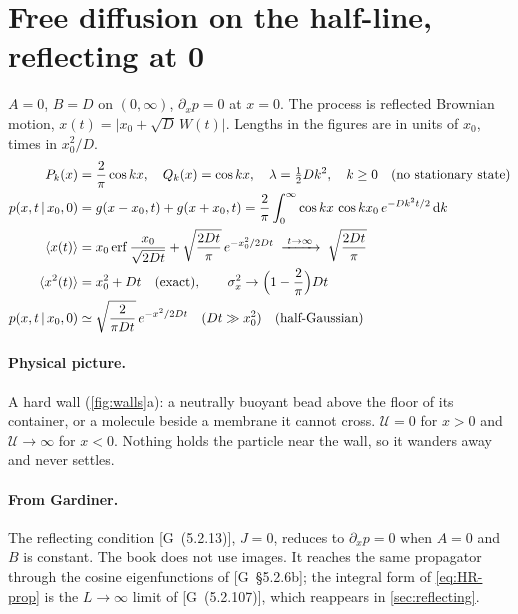 \documentclass[11pt]{article}
\numberwithin{equation}{section}
\newcommand{\dd}{\mathrm{d}}
\newcommand{\avg}[1]{\langle #1\rangle}
\newcommand{\given}{\,|\,}
\newcommand{\G}[1]{[G~(#1)]}
\newcommand{\Gs}[1]{[G~\S#1]}
\begin{document}
\section{Free diffusion on the half-line, reflecting at 0}
\label{sec:hl-reflecting}

\begin{keyresults}
$A=0$, $B=D$ on $(0,\infty)$, $\partial_xp=0$ at $x=0$. The process is reflected Brownian motion,
$x(t)=\lvert x_0+\sqrt D\,W(t)\rvert$. Lengths in the figures are in units of $x_0$, times in $x_0^2/D$.
\begin{align}
  P_k(x) &= \frac2\pi\cos kx,\quad Q_k(x)=\cos kx,\quad \lambda=\tfrac12Dk^2,\quad k\ge0
  \quad\text{(no stationary state)} \\
  p(x,t\given x_0,0) &= g(x-x_0,t)+g(x+x_0,t)
  = \frac2\pi\int_0^\infty\cos kx\,\cos kx_0\,e^{-Dk^2t/2}\,\dd k \label{eq:HR-prop}\\
  \avg{x(t)} &= x_0\operatorname{erf}\frac{x_0}{\sqrt{2Dt}}+\sqrt{\frac{2Dt}{\pi}}\,e^{-x_0^2/2Dt}
  \;\xrightarrow{\;t\to\infty\;}\;\sqrt{\frac{2Dt}{\pi}} \\
  \avg{x^2(t)} &= x_0^2+Dt \quad\text{(exact)},\qquad
  \sigma_x^2\to\Bigl(1-\frac2\pi\Bigr)Dt \\
  p(x,t\given x_0,0) &\simeq \sqrt{\frac{2}{\pi Dt}}\,e^{-x^2/2Dt}\quad (Dt\gg x_0^2)\quad\text{(half-Gaussian)}
\end{align}
\end{keyresults}

\paragraph{Physical picture.} A hard wall (\cref{fig:walls}a): a neutrally buoyant bead above the floor of its
container, or a molecule beside a membrane it cannot cross. $\mathcal U=0$ for $x>0$ and $\mathcal U\to\infty$ for
$x<0$. Nothing holds the particle near the wall, so it wanders away and never settles.

\paragraph{From Gardiner.} The reflecting condition \G{5.2.13}, $J=0$, reduces to $\partial_xp=0$ when $A=0$
and $B$ is constant. The book does not use images. It reaches the same propagator through the cosine
eigenfunctions of \Gs{5.2.6b}; the integral form of \cref{eq:HR-prop} is the $L\to\infty$ limit of
\G{5.2.107}, which reappears in \cref{sec:reflecting}.
\end{document}
